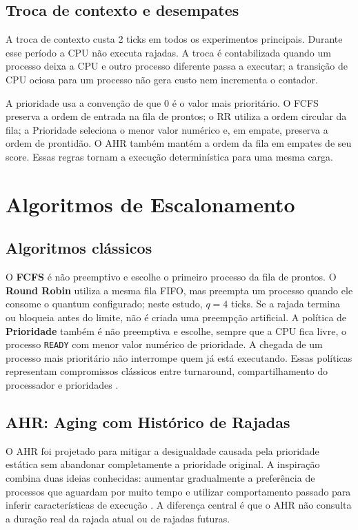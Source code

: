 \documentclass[conference]{IEEEtran}
\begin{document}
\subsection{Troca de contexto e desempates}
A troca de contexto custa 2 ticks em todos os experimentos principais. Durante esse período a CPU não executa rajadas. A troca é contabilizada quando um processo deixa a CPU e outro processo diferente passa a executar; a transição de CPU ociosa para um processo não gera custo nem incrementa o contador.

A prioridade usa a convenção de que 0 é o valor mais prioritário. O FCFS preserva a ordem de entrada na fila de prontos; o RR utiliza a ordem circular da fila; a Prioridade seleciona o menor valor numérico e, em empate, preserva a ordem de prontidão. O AHR também mantém a ordem da fila em empates de seu score. Essas regras tornam a execução determinística para uma mesma carga.

\section{Algoritmos de Escalonamento}
\subsection{Algoritmos clássicos}
O \textbf{FCFS} é não preemptivo e escolhe o primeiro processo da fila de prontos. O \textbf{Round Robin} utiliza a mesma fila FIFO, mas preempta um processo quando ele consome o quantum configurado; neste estudo, $q=4$ ticks. Se a rajada termina ou bloqueia antes do limite, não é criada uma preempção artificial. A política de \textbf{Prioridade} também é não preemptiva e escolhe, sempre que a CPU fica livre, o processo \texttt{READY} com menor valor numérico de prioridade. A chegada de um processo mais prioritário não interrompe quem já está executando. Essas políticas representam compromissos clássicos entre turnaround, compartilhamento do processador e prioridades \cite{ostep}.

\subsection{AHR: Aging com Histórico de Rajadas}
O AHR foi projetado para mitigar a desigualdade causada pela prioridade estática sem abandonar completamente a prioridade original. A inspiração combina duas ideias conhecidas: aumentar gradualmente a preferência de processos que aguardam por muito tempo e utilizar comportamento passado para inferir características de execução \cite{ostep}. A diferença central é que o AHR não consulta a duração real da rajada atual ou de rajadas futuras.
\end{document}
